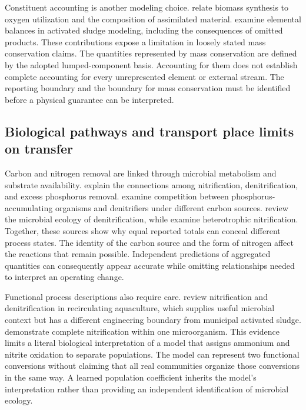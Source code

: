 Constituent accounting is another modeling choice. \citet{Hoover1952} relate biomass synthesis to oxygen utilization and the composition of assimilated material. \citet{TakacsVanrolleghem2006} examine elemental balances in activated sludge modeling, including the consequences of omitted products. These contributions expose a limitation in loosely stated mass conservation claims. The quantities represented by mass conservation are defined by the adopted lumped-component basis. Accounting for them does not establish complete accounting for every unrepresented element or external stream. The reporting boundary and the boundary for mass conservation must be identified before a physical guarantee can be interpreted.

\subsection{Biological pathways and transport place limits on transfer}

Carbon and nitrogen removal are linked through microbial metabolism and substrate availability. \citet{Wentzel1992} explain the connections among nitrification, denitrification, and excess phosphorus removal. \citet{Guerrero2011} examine competition between phosphorus-accumulating organisms and denitrifiers under different carbon sources. \citet{Lu2014} review the microbial ecology of denitrification, while \citet{Duan2022} examine heterotrophic nitrification. Together, these sources show why equal reported totals can conceal different process states. The identity of the carbon source and the form of nitrogen affect the reactions that remain possible. Independent predictions of aggregated quantities can consequently appear accurate while omitting relationships needed to interpret an operating change.

Functional process descriptions also require care. \citet{Preena2021} review nitrification and denitrification in recirculating aquaculture, which supplies useful microbial context but has a different engineering boundary from municipal activated sludge. \citet{VanKessel2015} demonstrate complete nitrification within one microorganism. This evidence limits a literal biological interpretation of a model that assigns ammonium and nitrite oxidation to separate populations. The model can represent two functional conversions without claiming that all real communities organize those conversions in the same way. A learned population coefficient inherits the model's interpretation rather than providing an independent identification of microbial ecology.

